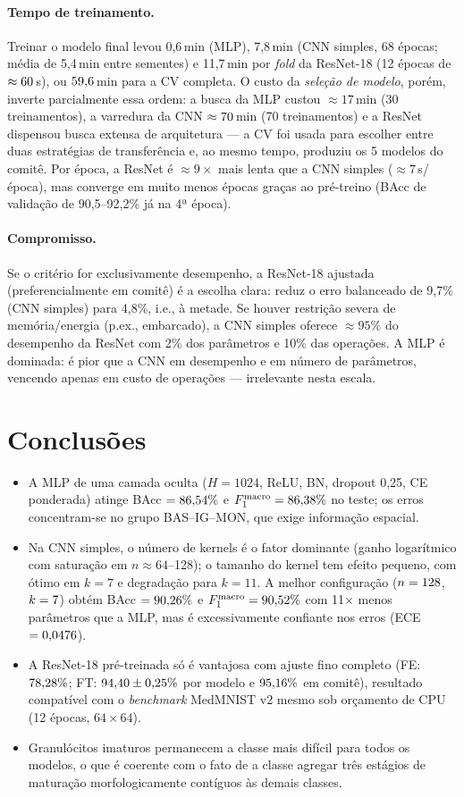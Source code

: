\paragraph{Tempo de treinamento.} Treinar o modelo final levou 0,6\,min (MLP), 7,8\,min (CNN simples,
68 épocas; média de 5,4\,min entre sementes) e 11,7\,min por \emph{fold} da ResNet-18 (12 épocas de
$\approx60$\,s), ou $59{,}6$\,min para a CV completa. O custo da \emph{seleção de modelo}, porém,
inverte parcialmente essa ordem: a busca da MLP custou $\approx17$\,min (30 treinamentos), a varredura da CNN
$\approx70$\,min (70 treinamentos) e a ResNet dispensou busca extensa de arquitetura --- a CV
foi usada para escolher entre duas estratégias de transferência e, ao mesmo tempo, produziu os 5 modelos do
comitê. Por época, a ResNet é $\approx9\times$ mais lenta que a CNN simples ($\approx7$\,s/época), mas converge
em muito menos épocas graças ao pré-treino (BAcc de validação de 90,5--92,2\% já na 4ª época).

\paragraph{Compromisso.} Se o critério for exclusivamente desempenho, a ResNet-18 ajustada (preferencialmente
em comitê) é a escolha clara: reduz o erro balanceado de 9,7\% (CNN simples) para 4,8\%, i.e., à metade. Se
houver restrição severa de memória/energia (p.ex., embarcado), a CNN simples oferece $\approx95\%$ do
desempenho da ResNet com 2\% dos parâmetros e 10\% das operações. A MLP é dominada: é pior que a CNN em
desempenho e em número de parâmetros, vencendo apenas em custo de operações --- irrelevante nesta escala.

\section{Conclusões}
\begin{itemize}
\item A MLP de uma camada oculta ($H=1024$, ReLU, BN, dropout 0,25, CE ponderada) atinge BAcc $=86{,}54\%$ e
$F_1^{\mathrm{macro}}=86{,}38\%$ no teste; os erros concentram-se no grupo BAS--IG--MON, que exige informação espacial.
\item Na CNN simples, o número de kernels é o fator dominante (ganho logarítmico com saturação em $n\approx64$--128);
o tamanho do kernel tem efeito pequeno, com ótimo em $k=7$ e degradação para $k=11$. A melhor configuração
($n=128$, $k=7$) obtém BAcc $=90{,}26\%$ e $F_1^{\mathrm{macro}}=90{,}52\%$ com 11$\times$ menos parâmetros que a MLP,
mas é excessivamente confiante nos erros (ECE $=0{,}0476$).
\item A ResNet-18 pré-treinada só é vantajosa com ajuste fino completo (FE: $78{,}28\%$; FT: $94{,}40 \pm 0{,}25\%$
por modelo e $95{,}16\%$ em comitê), resultado compatível com o \emph{benchmark} MedMNIST v2 mesmo sob
orçamento de CPU (12 épocas, $64\times64$).
\item Granulócitos imaturos permanecem a classe mais difícil para todos os modelos, o que é coerente com
o fato de a classe agregar três estágios de maturação morfologicamente contíguos às demais classes.
\end{itemize}
